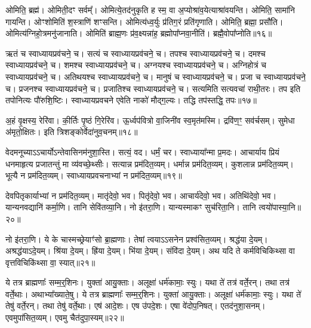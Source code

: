 ओमिति॒ ब्रह्म॑। 
ओमिती॒दꣳ सर्वम्᳚। 
ओमित्ये॒तद॑नुकृति ह स्म॒ वा अ॒प्योश्रा॑व॒येत्याश्रा॑वयन्ति। 
ओमिति॒ सामा॑नि गायन्ति। 
ओꣳ\-शोमिति॑ श॒स्त्राणि॑ शꣳसन्ति। 
ओमित्य॑ध्व॒र्युः प्र॑तिग॒रं प्रति॑\-गृणाति। 
ओमिति॒ ब्रह्मा॒ प्रसौ॑ति। 
ओमित्य॑ग्निहो॒त्रमनु॑जानाति। 
ओमिति॑ ब्राह्म॒णः प्र॑व॒क्ष्यन्ना॑ह॒ ब्रह्मोपा᳚प्नवा॒नीति॑। 
ब्रह्मै॒वो\-पा᳚प्नोति॥१६॥%
\anuvakamend[ओन्दश॑]

ऋतं च स्वाध्याय\-प्रव॑चने॒ च। 
सत्यं च स्वाध्याय\-प्रव॑चने॒ च। 
तपश्च स्वाध्याय\-प्रव॑चने॒ च। 
दमश्च स्वाध्याय\-प्रव॑चने॒ च। 
शमश्च स्वाध्याय\-प्रव॑चने॒ च। 
अग्नयश्च स्वाध्याय\-प्रव॑चने॒ च। 
अग्निहोत्रं च स्वाध्याय\-प्रव॑चने॒ च। 
अतिथयश्च स्वाध्याय\-प्रव॑चने॒ च। 
मानुषं च स्वाध्याय\-प्रव॑चने॒ च। 
प्रजा च स्वाध्याय\-प्रव॑चने॒ च। 
प्रजनश्च स्वाध्याय\-प्रव॑चने॒ च। 
प्रजातिश्च स्वाध्याय\-प्रव॑चने॒ च। 
सत्यमिति सत्य\-वचा॑ राथी॒तरः। 
तप इति तपो\-नित्यः पौ॑रुशि॒ष्टिः। 
स्वाध्याय\-प्रवचने एवेति नाको॑ मौद्ग॒ल्यः। 
तद्धि तप॑स्तद्धि॒ तपः॥१७॥
\anuvakamend[प्रजा च स्वाध्याय\-प्रव॑चने॒ च षट्च॑]

अ॒हं वृ॒क्षस्य॒ रेरि॑वा। 
की॒र्तिः पृ॒ष्ठं गि॒रेरि॑व। 
ऊ॒र्ध्वप॑वित्रो वा॒जिनी॑व स्व॒मृत॑मस्मि। 
द्रवि॑ण॒ꣳ॒ सव॑र्चसम्। 
सुमेधा अ॑मृतो॒क्षितः। 
इति त्रिशङ्कोर्वेदा॑नुव॒चनम्॥१८॥
\anuvakamend[अ॒हꣳ षट्]

वेदमनूच्याऽऽचार्योऽन्तेवासिनम॑नुशा॒स्ति। 
सत्यं॒ वद। 
धर्मं॒ चर। 
स्वाध्याया᳚न्मा प्र॒मदः। 
आचार्याय प्रियं धनमाहृत्य प्रजातन्तुं मा व्य॑वच्छे॒थ्सीः। 
सत्यान्न प्रम॑दित॒व्यम्। 
धर्मान्न प्रम॑दित॒व्यम्। 
कुशलान्न प्रम॑दित॒व्यम्। 
भूत्यै न प्रम॑दित॒व्यम्। 
स्वाध्याय\-प्रवचनाभ्यां न प्रम॑दित॒व्यम्॥१९॥

देवपितृकार्याभ्यां न प्रम॑दित॒व्यम्। 
मातृ॑देवो॒ भव। 
पितृ॑देवो॒ भव। 
आचार्य॑देवो॒ भव। 
अतिथि॑देवो॒ भव। 
यान्यनवद्यानि॑ कर्मा॒णि। 
तानि सेवि॑तव्या॒नि। 
नो इ॑तरा॒णि। 
यान्यस्माकꣳ सुच॑रिता॒नि। 
तानि त्वयो॑पास्या॒नि॥२०॥

नो इ॑तरा॒णि। 
ये के चास्मच्छ्रेयाꣳ॑सो ब्रा॒ह्मणाः। 
तेषां त्वयाऽऽसनेन प्रश्व॑सित॒व्यम्। 
श्रद्ध॑या दे॒यम्। 
अश्रद्ध॑याऽदे॒यम्। 
श्रि॑या दे॒यम्। 
ह्रि॑या दे॒यम्। 
भि॑या दे॒यम्। 
संवि॑दा दे॒यम्। 
अथ यदि ते कर्मविचिकिथ्सा वा वृत्तविचिकि॑थ्सा वा॒ स्यात्॥२१॥

ये तत्र ब्राह्मणाः᳚ सम्म॒र्॒\mbox{}शिनः। 
युक्ता॑ आयु॒क्ताः। 
अलूक्षा॑ धर्म॑कामाः॒ स्युः। 
यथा ते॑ तत्र॑ वर्ते॒रन्। 
तथा तत्र॑ वर्ते॒थाः। 
अथाभ्या᳚ख्याते॒षु। 
ये तत्र ब्राह्मणाः᳚ सम्म॒र्॒\mbox{}शिनः। 
युक्ता॑ आयु॒क्ताः। 
अलूक्षा॑ धर्म॑कामाः॒ स्युः। 
यथा ते॑ तेषु॑ वर्ते॒रन्। 
तथा तेषु॑ वर्ते॒थाः। 
एष॑ आदे॒शः। 
एष उ॑पदे॒शः। 
एषा वे॑दोप॒निषत्। 
एतद॑नुशा॒सनम्। 
एवमुपा॑सित॒व्यम्। 
एवमु चैत॑दुपा॒स्यम्॥२२॥
\anuvakamend[स्वाध्यायप्रवचनाभ्यान्न प्रम॑दित॒व्यं तानि त्वयो॑पास्या॒नि स्यात्तेषु॑ वर्ते॒रन्थ्स॒प्त च॑]

